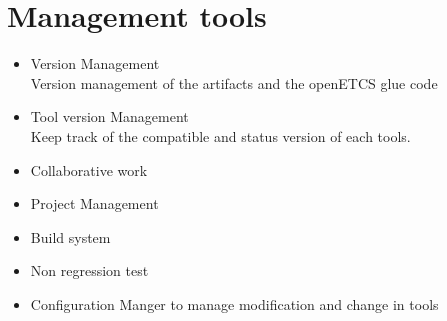 \section{Management tools}
\begin{itemize}
\item Version Management\\
Version management of the artifacts and the openETCS glue code 
\item Tool version Management \\
Keep track of the compatible and status version of each tools. 
\item Collaborative work
\item Project  Management
\item Build system
\item Non regression test
\item Configuration Manger to manage modification and change in tools
\end{itemize}



